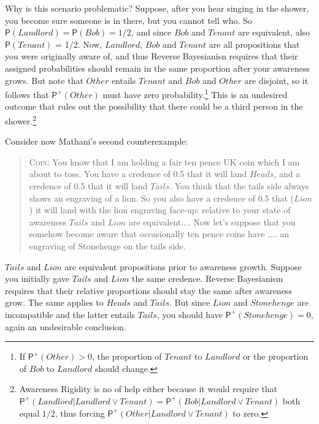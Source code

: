 \documentclass[
  11pt,
  dvipsnames,enabledeprecatedfontcommands]{scrartcl}
\newcommand{\pr}[1]{\ensuremath{\mathsf{P}(#1)}}
\newcommand{\ppr}[2]{\ensuremath{\mathsf{P}^{#1}(#2)}}
\begin{document}
Why is this scenario problematic? Suppose, after you hear singing in the
shower, you become sure someone is in there, but you cannot tell who. So
\(\pr{Landlord} = \pr{Bob} = 1/2\), and since \(Bob\) and \(Tenant\) are
equivalent, also \(\pr{Tenant}\) = 1/2. Now, \(Landlord\), \(Bob\) and
\(Tenant\) are all propositions that you were originally aware of, and
thus Reverse Bayesianisn requires that their assigned probabilities
should remain in the same proportion after your awareness grows. But
note that \(Other\) entails \(Tenant\) and \(Bob\) and \(Other\) are
disjoint, so it follows that \(\ppr{+}{Other}\) must have zero
probability.\footnote{If \(\ppr{+}{Other}>0\), the proportion of
  \(Tenant\) to \(Landlord\) or the proportion of \(Bob\) to
  \(Landlord\) should change.} This is an undesired outcome that rules
out the possibility that there could be a third person in the
shower.\footnote{Awareness Rigidity is no of help either because it
  would require that
  \(\ppr{+}{Landlord \vert Landlord \vee Tenant}=\ppr{+}{Bob \vert Landlord \vee Tenant}\)
  both equal \(1/2\), thus forcing
  \(\ppr{+}{Other \vert Landlord \vee Tenant}\) to zero.}

Consider now Mathani's second counterexample:

\begin{quote} 
\textsc{Coin}: You know that I am holding a fair ten pence UK coin which I am about to toss. You
have a credence of 0.5 that it will land $Heads$, and a credence of 0.5 that it will
land $Tails$. You think that the tails side always shows an engraving of a lion. So you
also  have a credence of 0.5 that ($Lion$) it will land with the lion engraving face-up: relative to your state of awareness $Tails$ and $Lion$ are equivalent.... Now let's suppose that you somehow become aware
that occasionally ten pence coins have .... an engraving of Stonehenge on the tails side. 
\end{quote}

\doublespace

\noindent  \(Tails\) and \(Lion\) are equivalent propositions prior to
awareness growth. Suppose you initially gave \(Tails\) and \(Lion\) the
same credence. Reverse Bayesianism requires that their relative
proportions should stay the same after awareness grow. The same applies
to \(Heads\) and \(Tails\). But since \(Lion\) and \(Stonehenge\) are
incompatible and the latter entails \(Tails\), you should have
\(\ppr{+}{Stonehenge} = 0\), again an undesirable conclusion.
\end{document}
